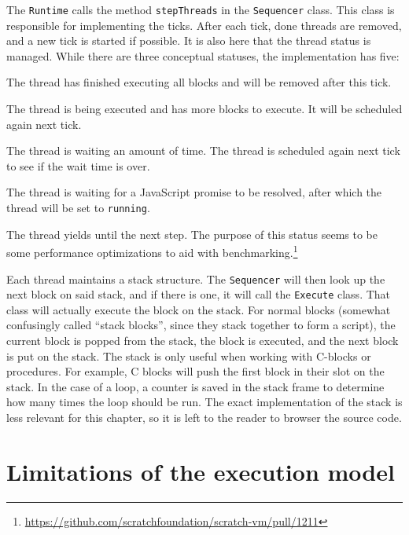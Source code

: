 \documentclass[../main]{subfiles}
\begin{document}
The \texttt{Runtime} calls the method \texttt{stepThreads} in the \texttt{Sequencer} class.
This class is responsible for implementing the ticks.
After each tick, done threads are removed, and a new tick is started if possible.
It is also here that the thread status is managed.
While there are three conceptual statuses, the implementation has five:
\begin{description}[noitemsep]
    \item[\texttt{done}] The thread has finished executing all blocks and will be removed after this tick.
    \item[\texttt{running}] The thread is being executed and has more blocks to execute.
        It will be scheduled again next tick.
    \item[\texttt{yield}] The thread is waiting an amount of time.
        The thread is scheduled again next tick to see if the wait time is over.
    \item[\texttt{promise wait}] The thread is waiting for a JavaScript promise to be resolved, after which the thread will be set to \texttt{running}.
    \item[\texttt{yield tick}] The thread yields until the next step.
        The purpose of this status seems to be some performance optimizations to aid with benchmarking.\footnote{\url{https://github.com/scratchfoundation/scratch-vm/pull/1211}}
\end{description}

Each thread maintains a stack structure.
The \texttt{Sequencer} will then look up the next block on said stack, and if there is one, it will call the \texttt{Execute} class.
That class will actually execute the block on the stack.
For normal blocks (somewhat confusingly called ``stack blocks'', since they stack together to form a script), the current block is popped from the stack, the block is executed, and the next block is put on the stack.
The stack is only useful when working with C-blocks or procedures.
For example, C blocks will push the first block in their slot on the stack.
In the case of a loop, a counter is saved in the stack frame to determine how many times the loop should be run.
The exact implementation of the stack is less relevant for this chapter, so it is left to the reader to browser the source code.

\section{Limitations of the execution model}\label{sec:limitations-of-the-execution-model-for-the-debugger}
\end{document}
